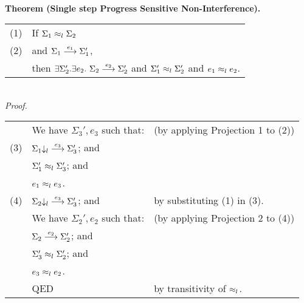\\
\textbf{Theorem (Single step Progress Sensitive Non-Interference).}
\\
\begin{tabular}{l@{$\qquad$}l}
  (1) & If $\lequiv{l}{\Sigma_1}{\Sigma_2}$
\\
  (2) & and $\sstep{e_1}{\Sigma_1}{\Sigma_1'}$,
\\
      & then $\exists \Sigma_2'.\exists e_2.~\sstep{e_2}{\Sigma_2}{\Sigma_2'}$
        and $\lequiv{l}{\Sigma_1'}{\Sigma_2'}$
        and $\lequiv{l}{e_1}{e_2}$.
\end{tabular}
\\
\textit{Proof.}
\\
\begin{tabular}{l@{$\qquad$}l@{\qquad}l}
      & We have $\Sigma_3',e_3$ such that:
      & (by applying Projection 1 to (2))
\\
  (3) & $\sstep{e_3}{\proj{\Sigma_1}{l}}{\Sigma_3'}$; and
\\
      & $\lequiv{l}{\Sigma_1'}{\Sigma_3'}$; and
\\
      & $\lequiv{l}{e_1}{e_3}$.
\\
  (4) & $\sstep{e_3}{\proj{\Sigma_2}{l}}{\Sigma_3'}$; and
      & by substituting (1) in (3).
\\
      & We have $\Sigma_2',e_2$ such that:
      & (by applying Projection 2 to (4))
\\
      & $\sstep{e_2}{\Sigma_2}{\Sigma_2'}$; and
\\
      & $\lequiv{l}{\Sigma_3'}{\Sigma_2'}$; and
\\
      & $\lequiv{l}{e_3}{e_2}$.
\\
      & QED
      & by transitivity of $\lequiv{l}{}{}$.
\end{tabular}
